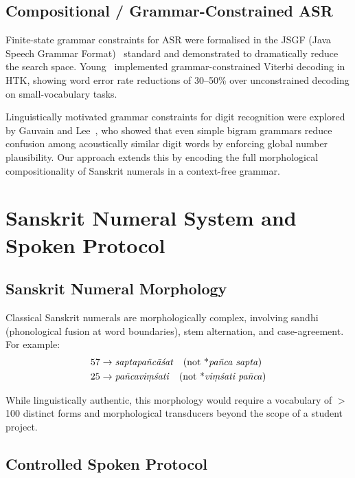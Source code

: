 \documentclass[12pt,a4paper]{article}
\begin{document}
\subsection{Compositional / Grammar-Constrained ASR}

Finite-state grammar constraints for ASR were formalised in the
JSGF (Java Speech Grammar Format)~\cite{jsgf1998} standard and demonstrated
to dramatically reduce the search space.
Young~\cite{young1994htk} implemented grammar-constrained Viterbi decoding
in HTK, showing word error rate reductions of 30--50\% over unconstrained
decoding on small-vocabulary tasks.

Linguistically motivated grammar constraints for digit recognition were
explored by Gauvain and Lee~\cite{gauvain1994bayesian}, who showed that even
simple bigram grammars reduce confusion among acoustically similar digit words
by enforcing global number plausibility.
Our approach extends this by encoding the full morphological compositionality
of Sanskrit numerals in a context-free grammar.

\section{Sanskrit Numeral System and Spoken Protocol}
\label{sec:protocol}

\subsection{Sanskrit Numeral Morphology}

Classical Sanskrit numerals are morphologically complex, involving sandhi
(phonological fusion at word boundaries), stem alternation, and
case-agreement.
For example:
\begin{align*}
  57 &\to \text{\textit{saptapa\~{n}c\={a}\'{s}at}} \quad
         \text{(not *\textit{pa\~{n}ca sapta})}\\
  25 &\to \text{\textit{pa\~{n}cavi\d{m}\'{s}ati}} \quad
         \text{(not *\textit{vi\d{m}\'{s}ati pa\~{n}ca})}
\end{align*}

While linguistically authentic, this morphology would require a vocabulary of
$>$100 distinct forms and morphological transducers beyond the scope of a
student project.

\subsection{Controlled Spoken Protocol}
\label{sec:spoken_protocol}
\end{document}
